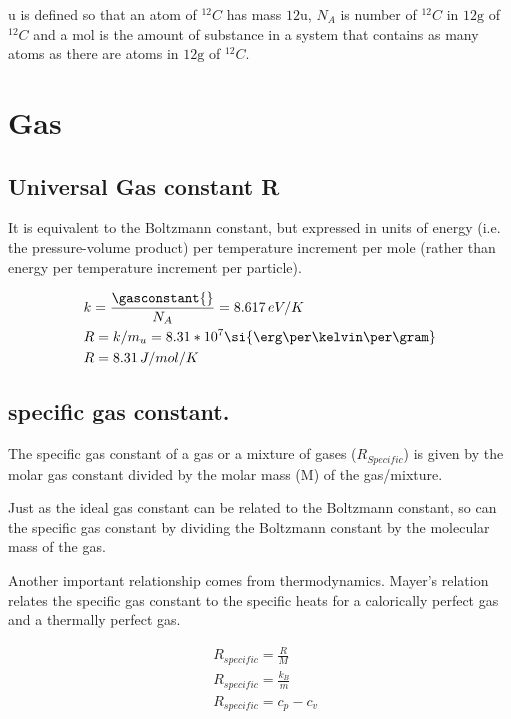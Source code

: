 \si{\atomicmassunit} is defined so that an atom of $^{12}C$ has mass $12 \si{\atomicmassunit}$, $N_A$ is number of $^{12}C$ in $12 \si{\gram}$ of $^{12}C$ and a \si{\mole} is the amount of substance in a system that contains as many atoms as there are atoms in $12\si{\gram}$ of $^{12}C$.



\section{Gas}

\subsection{Universal Gas constant R}

It is equivalent to the Boltzmann constant, but expressed in units of energy (i.e. the pressure-volume product) per temperature increment per mole (rather than energy per temperature increment per particle).

\begin{align*}
&k=\frac{\gasconstant{}}{N_A}=8.617\,eV/K\\
&R=k/m_u=8.31*10^7 \si{\erg\per\kelvin\per\gram}\\
&R=8.31\,J/mol/K
\end{align*}

\subsection{specific gas constant.}

The specific gas constant of a gas or a mixture of gases ($R_{Specific}$) is given by the molar gas constant divided by the molar mass (M) of the gas/mixture.

Just as the ideal gas constant can be related to the Boltzmann constant, so can the specific gas constant by dividing the Boltzmann constant by the molecular mass of the gas.

Another important relationship comes from thermodynamics. Mayer's relation relates the specific gas constant to the specific heats for a calorically perfect gas and a thermally perfect gas.

\begin{align*}
&R_{specific} = \frac{R}{M}\\
&R_{specific} = \frac{{k_{B}}}{m}\\
&R_{specific} = c_p - c_v
\end{align*}

